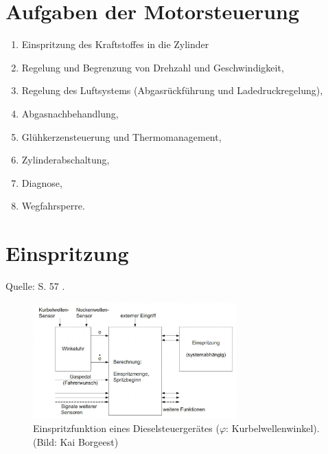 \section{Aufgaben der
Motorsteuerung}\label{aufgaben-der-motorsteuerung}

\begin{enumerate}
\item
  Einspritzung des Kraftstoffes in die Zylinder
\item
  Regelung und Begrenzung von Drehzahl und Geschwindigkeit,
\item
  Regelung des Luftsystems (Abgasrückführung und Ladedruckregelung),
\item
  Abgasnachbehandlung,
\item
  Glühkerzensteuerung und Thermomanagement,
\item
  Zylinderabschaltung,
\item
  Diagnose,
\item
  Wegfahrsperre.
\end{enumerate}

\newpage

\section{Einspritzung}\label{einspritzung}

Quelle: S. 57 \textcite{borgeest:2021:elektronik}.

\begin{figure}[!ht]%
\centering
\includegraphics[width=0.7\textwidth]{images/EDC/EDC-1.pdf}
\caption{Einspritzfunktion eines Dieselsteuergerätes ($\varphi$:
Kurbelwellenwinkel). (Bild: Kai Borgeest)}
\end{figure}


